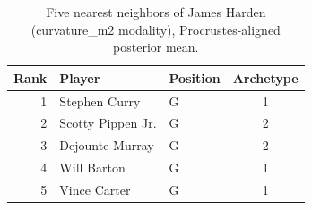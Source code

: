 \begin{table}[htbp]
  \centering\small
  \begin{tabular}{rllc}
    \toprule
    Rank & Player & Position & Archetype \\
    \midrule
    1 & Stephen Curry & G & 1 \\
    2 & Scotty Pippen Jr. & G & 2 \\
    3 & Dejounte Murray & G & 2 \\
    4 & Will Barton & G & 1 \\
    5 & Vince Carter & G & 1 \\
    \bottomrule
  \end{tabular}
  \caption{Five nearest neighbors of James Harden (curvature_m2 modality), Procrustes-aligned posterior mean.}
  \label{tab:James_Harden_neighbors_curvature_m2}
\end{table}

